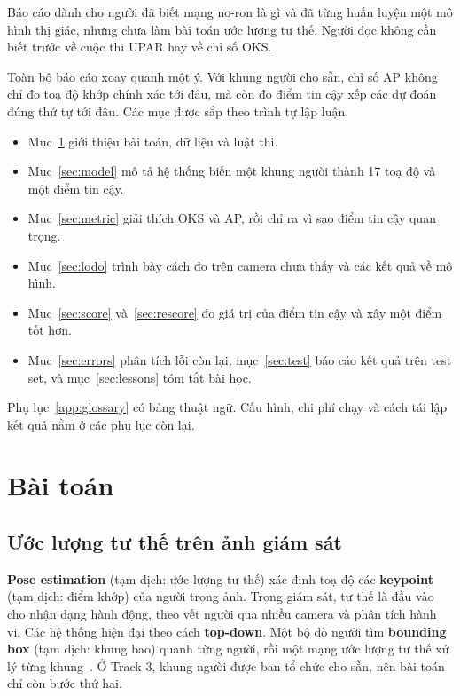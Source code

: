 \documentclass[11pt,a4paper]{article}
\begin{document}
Báo cáo dành cho người đã biết mạng nơ-ron là gì và đã từng huấn luyện một mô hình thị giác, nhưng chưa làm bài toán ước lượng tư thế. Người đọc không cần biết trước về cuộc thi UPAR hay về chỉ số OKS.

Toàn bộ báo cáo xoay quanh một ý. Với khung người cho sẵn, chỉ số AP không chỉ đo toạ độ khớp chính xác tới đâu, mà còn đo điểm tin cậy xếp các dự đoán đúng thứ tự tới đâu. Các mục được sắp theo trình tự lập luận.

\begin{itemize}[leftmargin=1.4em]
\item Mục~\ref{sec:task} giới thiệu bài toán, dữ liệu và luật thi.
\item Mục~\ref{sec:model} mô tả hệ thống biến một khung người thành 17 toạ độ và một điểm tin cậy.
\item Mục~\ref{sec:metric} giải thích OKS và AP, rồi chỉ ra vì sao điểm tin cậy quan trọng.
\item Mục~\ref{sec:lodo} trình bày cách đo trên camera chưa thấy và các kết quả về mô hình.
\item Mục~\ref{sec:score} và~\ref{sec:rescore} đo giá trị của điểm tin cậy và xây một điểm tốt hơn.
\item Mục~\ref{sec:errors} phân tích lỗi còn lại, mục~\ref{sec:test} báo cáo kết quả trên test set, và mục~\ref{sec:lessons} tóm tắt bài học.
\end{itemize}

Phụ lục~\ref{app:glossary} có bảng thuật ngữ. Cấu hình, chi phí chạy và cách tái lập kết quả nằm ở các phụ lục còn lại.

\section{Bài toán}
\label{sec:task}

\subsection{Ước lượng tư thế trên ảnh giám sát}

\textbf{Pose estimation} (tạm dịch: ước lượng tư thế) xác định toạ độ các \textbf{keypoint} (tạm dịch: điểm khớp) của người trong ảnh. Trong giám sát, tư thế là đầu vào cho nhận dạng hành động, theo vết người qua nhiều camera và phân tích hành vi. Các hệ thống hiện đại theo cách \textbf{top-down}. Một bộ dò người tìm \textbf{bounding box} (tạm dịch: khung bao) quanh từng người, rồi một mạng ước lượng tư thế xử lý từng khung~\cite{simplebaseline,hrnet,vitpose}. Ở Track 3, khung người được ban tổ chức cho sẵn, nên bài toán chỉ còn bước thứ hai.
\end{document}
